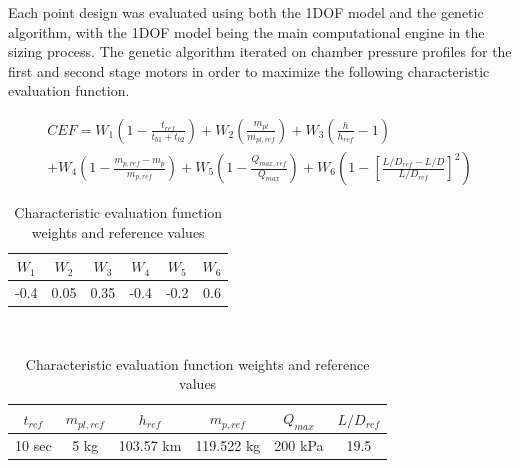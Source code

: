 Each point design was evaluated using both the 1DOF model and the genetic algorithm, with the 1DOF model being the main computational engine in the sizing process. The genetic algorithm iterated on chamber pressure profiles for the first and second stage motors in order to maximize the following characteristic evaluation function.

\begin{multline*}
    CEF = W_1 \left(1 - \frac{t_{ref}}{t_{b1} + t_{b2}}\right) + W_2 \left(\frac{m_{pl}}{m_{pl,ref}}\right) + W_3 \left(\frac{h}{h_{ref}} - 1\right) \\ 
    + W_4 \left(1 - \frac{m_{p,ref} - m_p}{m_{p,ref}}\right) + W_5 \left(1 - \frac{Q_{max,ref}}{Q_{max}}\right) + W_6 \left(1 - \left[\frac{L/D_{ref} - L/D}{L/D_{ref}}\right]^2\right)
\end{multline*}

\begin{table}
    \centering
    \begin{tabular}{cccccc}
        \(W_1\) & \(W_2\) & \(W_3\) & \(W_4\) & \(W_5\) & \(W_6\) \\ \hline
        -0.4 & 0.05 & 0.35 & -0.4 & -0.2 & 0.6
    \end{tabular}
    \vspace{0.3cm} \\
    \begin{tabular}{cccccc}
        \(t_{ref}\) & \(m_{pl,ref}\) & \(h_{ref}\) & \(m_{p,ref}\) & \(Q_{max}\) & \(L/D_{ref}\) \\ \hline
        10 sec & 5 kg & 103.57 km & 119.522 kg & 200 kPa & 19.5
    \end{tabular}
    \caption{Characteristic evaluation function weights and reference values}
    \label{table:CEF-weights-ref}
\end{table}

